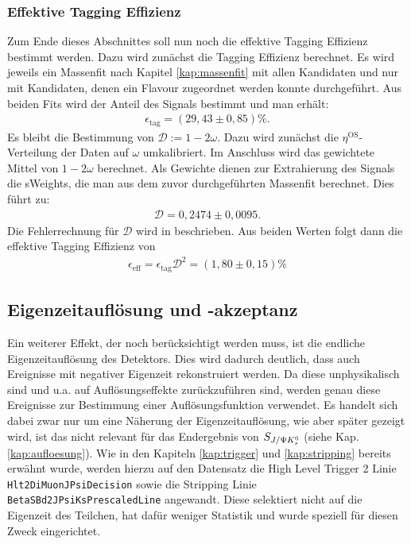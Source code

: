 \subsubsection{Effektive Tagging Effizienz}
Zum Ende dieses Abschnittes soll nun noch die effektive Tagging Effizienz bestimmt werden. Dazu wird zunächst die Tagging Effizienz berechnet. Es wird jeweils ein Massenfit nach Kapitel \ref{kap:massenfit} mit allen Kandidaten und nur mit Kandidaten, denen ein Flavour zugeordnet werden konnte durchgeführt. Aus beiden Fits wird der Anteil des Signals bestimmt und man erhält:
\begin{align}
\epsilon_{\text{tag}} = (29,43\pm 0,85)\%.
\end{align}
Es bleibt die Bestimmung von $\mathcal{D}:=1-2\omega$. Dazu wird zunächst die $\eta^{\text{OS}}$-Verteilung der Daten auf $\omega$ umkalibriert. Im Anschluss wird das gewichtete Mittel von $1-2\omega$ berechnet. Als Gewichte dienen zur Extrahierung des Signals die sWeights, die man aus dem zuvor durchgeführten Massenfit berechnet. Dies führt zu:
\begin{align}
\mathcal{D} = 0,2474\pm 0,0095.
\end{align}
Die Fehlerrechnung für $\mathcal{D}$ wird in \cite{2010-analyse} beschrieben. Aus beiden Werten folgt dann die effektive Tagging Effizienz von
\begin{align}
\epsilon_{\text{eff}} = \epsilon_{\text{tag}} \mathcal{D}^2 = (1,80\pm 0,15)\%
\end{align}

\subsection{Eigenzeitauflösung und -akzeptanz}
Ein weiterer Effekt, der noch berücksichtigt werden muss, ist die endliche Ei\-gen\-zeit\-auf\-lösung des Detektors. Dies wird dadurch deutlich, dass auch Ereignisse mit negativer Eigenzeit rekonstruiert werden. Da diese unphysikalisch sind und u.a. auf Auflösungseffekte zurückzuführen sind, werden genau diese Ereignisse zur Bestimmung einer Auflösungsfunktion verwendet. Es handelt sich dabei zwar nur um eine Näherung der Eigenzeitauflösung, wie aber später gezeigt wird, ist das nicht relevant für das Endergebnis von $S_{J/\Psi K_s^0}$ (siehe Kap. \ref{kap:aufloesung}). Wie in den Kapiteln \ref{kap:trigger} und \ref{kap:stripping} bereits erwähnt wurde, werden hierzu auf den Datensatz die High Level Trigger 2 Linie \texttt{Hlt2DiMuonJPsiDecision} sowie die Stripping Linie \texttt{BetaSBd2JPsiKsPrescaledLine} angewandt. Diese selektiert nicht auf die Eigenzeit des Teilchen, hat dafür weniger Statistik und wurde speziell für diesen Zweck eingerichtet.

